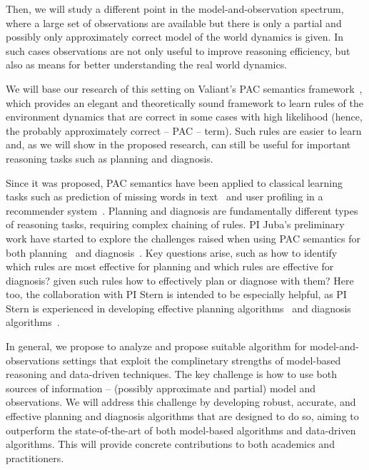 \documentclass[12pt]{article}
\begin{document}
Then, we will study a different point in the model-and-observation spectrum, where a large set of observations are available but there is only a partial and possibly only approximately correct model of the world dynamics is given. In such cases observations are not only useful to improve reasoning efficiency, but also as means for better understanding the real world dynamics. 

We will base our research of this setting on Valiant's PAC semantics framework~\cite{valiant2000robustLogics,valiant2000neuroidal}, which provides an elegant and theoretically sound framework to learn 
rules of the environment dynamics that are correct in some cases with high likelihood (hence, the probably approximately correct -- PAC -- term). 
Such rules are easier to learn and, as we will show in the proposed research, can still be useful for important reasoning tasks such as planning and diagnosis. 

Since it was proposed, PAC semantics have been applied to classical learning tasks such as prediction of missing words in text~\cite{michael2008first} and user profiling in a recommender system~\cite{semeraro2009knowledge}. Planning and diagnosis are fundamentally different types of reasoning tasks, requiring complex chaining of rules. PI Juba's preliminary work have started to explore the challenges raised when using PAC semantics for both planning~\cite{juba2016jmlr} and diagnosis~\cite{juba2016aaai}. Key questions arise, such as how to identify which rules are most effective for planning and which rules are effective for diagnosis? given such rules how to effectively plan or diagnose with them? 
Here too, the collaboration with PI Stern is intended to be especially helpful, as PI Stern is experienced in developing effective planning algorithms~\cite{stern2010usingLookahead,stern2014potential,gilon2016dynamic,sharon2013increasing,sharon2015conflict,gilon2016dynamic} and diagnosis algorithms~\cite{stern2012exploring,metodi2014novel,lazebnik2016solving,elmishali2016dataAugmented}.



In general, we propose to analyze and propose suitable algorithm for model-and-observations settings 
that exploit the complinetary strengths of model-based reasoning and data-driven techniques. The key challenge is how to use both sources of information -- (possibly approximate and partial) model and observations. We will address this challenge by developing robust, accurate, and effective planning and diagnosis algorithms that are designed to do so, aiming to outperform the state-of-the-art of both model-based algorithms and data-driven algorithms. This will provide concrete contributions to both academics and practitioners. 
\end{document}
